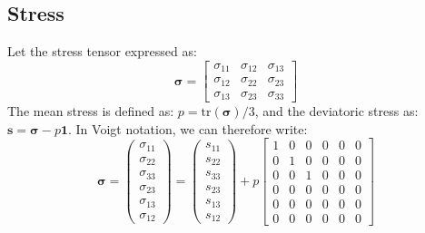 \documentclass[letterpaper,12pt,oneside]{report}
\begin{document}
\subsection{Stress}
Let the stress tensor expressed as:
\begin{equation}
\boldsymbol{\sigma} = 
\left[\begin{array}{ccc}
\sigma_{11} & \sigma_{12} & \sigma_{13} \\
\sigma_{12} & \sigma_{22} & \sigma_{23} \\
\sigma_{13} & \sigma_{23} & \sigma_{33}
\end{array}\right]
\end{equation}
The mean stress is defined as: $p = \mathrm{tr}(\boldsymbol{\sigma})/3$, and the deviatoric stress as: $\mathbf{s} = \boldsymbol{\sigma} - p \mathbf{1}$. In Voigt notation, we can therefore write:
\begin{equation}
\boldsymbol{\sigma} = 
\left(\begin{array}{c}
\sigma_{11} \\ \sigma_{22} \\ \sigma_{33} \\ \sigma_{23} \\ \sigma_{13} \\ \sigma_{12}
\end{array}\right)
 = 
\left(\begin{array}{c}
s_{11} \\ s_{22} \\ s_{33} \\ s_{23} \\ s_{13} \\ s_{12}
\end{array}\right)
+ p
\left[\begin{array}{cccccc}
1 & 0 & 0 & 0 & 0 & 0 \\
0 & 1 & 0 & 0 & 0 & 0 \\
0 & 0 & 1 & 0 & 0 & 0 \\
0 & 0 & 0 & 0 & 0 & 0 \\
0 & 0 & 0 & 0 & 0 & 0 \\
0 & 0 & 0 & 0 & 0 & 0
\end{array}\right]
\end{equation}
\end{document}
